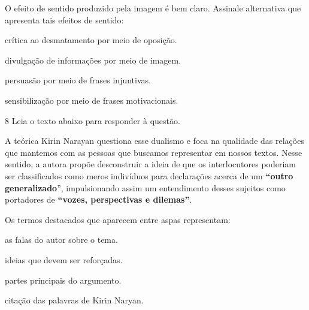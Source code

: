 O efeito de sentido produzido pela imagem é bem claro. Assinale
alternativa que apresenta tais efeitos de sentido:

\begin{escolha}

    \item crítica ao desmatamento por meio de oposição.

    \item divulgação de informações por meio de imagem.

    \item persuasão por meio de frases injuntivas. 

    \item sensibilização por meio de frases motivacionais. 

\end{escolha}

\num{8} Leia o texto abaixo para responder à questão. 

\begin{myquote}

A teórica Kirin Narayan questiona esse dualismo e foca na qualidade das
relações que mantemos com as pessoas que buscamos representar em nossos
textos. Nesse sentido, a autora propõe desconstruir a ideia de que os
interlocutores poderiam ser classificados como meros indivíduos para
declarações acerca de um \textbf{``outro generalizado}'', impulsionando
assim um entendimento desses sujeitos como portadores de
\textbf{``vozes, perspectivas e dilemas''}.


\end{myquote}


Os termos destacados que aparecem entre aspas representam:

\begin{escolha}

    \item as falas do autor sobre o tema.

    \item ideias que devem ser reforçadas.

    \item partes principais do argumento.

    \item citação das palavras de Kirin Naryan.

\end{escolha}

